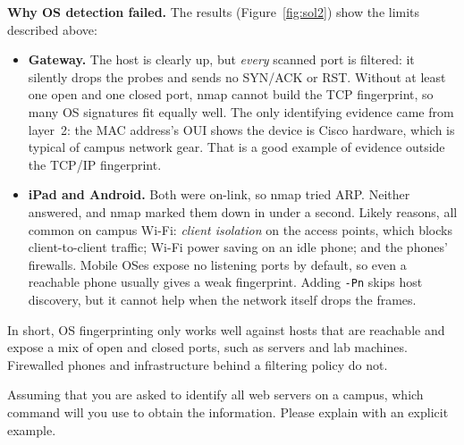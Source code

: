 \documentclass[a4paper, 10pt]{article}
\begin{document}
\begin{solution}
	\noindent \textbf{Why OS detection failed.} The results (Figure~\ref{fig:sol2}) show the limits
	described above:
	\begin{itemize}
		\item \textbf{Gateway.} The host is clearly up, but \emph{every} scanned port is filtered: it
		      silently drops the probes and sends no SYN/ACK or RST. Without at least one open and one
		      closed port, nmap cannot build the TCP fingerprint, so many OS signatures fit equally
		      well. The only identifying evidence came from layer~2: the MAC address's OUI shows the
		      device is Cisco hardware, which is typical of campus network gear. That is a good example
		      of evidence outside the TCP/IP fingerprint.
		\item \textbf{iPad and Android.} Both were on-link, so nmap tried ARP. Neither answered, and
		      nmap marked them down in under a second. Likely reasons, all common on campus Wi-Fi:
		      \emph{client isolation} on the access points, which blocks client-to-client traffic;
		      Wi-Fi power saving on an idle phone; and the phones' firewalls. Mobile OSes expose
		      no listening ports by default, so even a reachable phone usually gives a weak
		      fingerprint. Adding \texttt{-Pn} skips host discovery, but it cannot help when the
		      network itself drops the frames.
	\end{itemize}
	\noindent In short, OS fingerprinting only works well against hosts that are reachable and
	expose a mix of open and closed ports, such as servers and lab machines. Firewalled phones and
	infrastructure behind a filtering policy do not.
\end{solution}

\begin{problem}
Assuming that you are asked to identify all web servers on a campus, which command will you use to obtain the information.
Please explain with an explicit example.
\end{problem}
\end{document}
